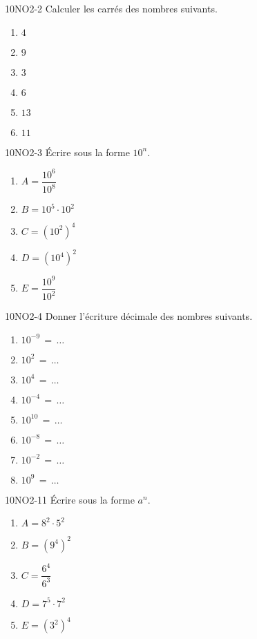 \documentclass[a4paper,12pt]{report}
\begin{document}
\begin{EXO}{}{10NO2-2}
Calculer les carrés des nombres suivants.

\begin{enumerate}[itemsep=2em]
	\item $4$
	\item $9$
	\item $3$
	\item $6$
	\item $13$
	\item $11$
\end{enumerate}
\end{EXO}

\begin{EXO}{}{10NO2-3}
Écrire sous la forme $10^n$.

\begin{enumerate}[itemsep=2em]
	\item $A=\dfrac{10^{6}}{10^{8}}$
	\item $B=10^{5}\cdot 10^{2}$
	\item $C=(10^{2})^{4}$
	\item $D=(10^{4})^{2}$
	\item $E=\dfrac{10^{9}}{10^{2}}$
\end{enumerate}
\end{EXO}

\begin{EXO}{}{10NO2-4}
Donner l'écriture décimale des nombres suivants.

\begin{enumerate}[]
	\item $10^{-9}\,=\,\dots$
	\item $10^{2}\,=\,\dots$
	\item $10^{4}\,=\,\dots$
	\item $10^{-4}\,=\,\dots$
	\item $10^{10}\,=\,\dots$
	\item $10^{-8}\,=\,\dots$
	\item $10^{-2}\,=\,\dots$
	\item $10^{9}\,=\,\dots$
\end{enumerate}
\end{EXO}

\begin{EXO}{}{10NO2-11}
Écrire sous la forme $a^n$.

\begin{enumerate}[itemsep=2em]
	\item $A=8^{2}\cdot 5^{2}$
	\item $B=(9^{4})^{2}$
	\item $C=\dfrac{6^{4}}{6^{3}}$
	\item $D=7^{5}\cdot 7^{2}$
	\item $E=(3^{2})^{4}$
\end{enumerate}
\end{EXO}
\end{document}
